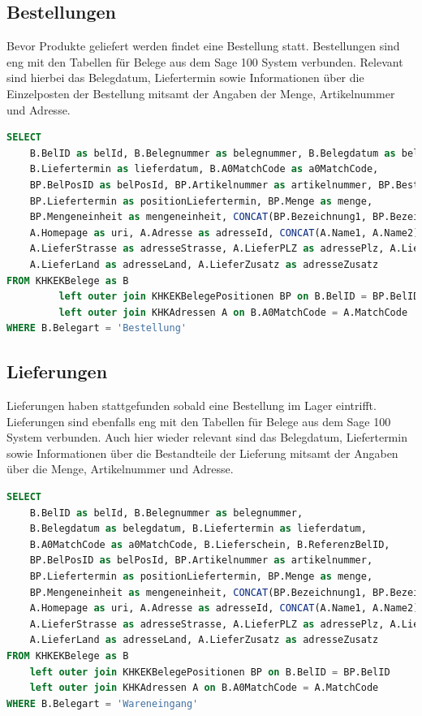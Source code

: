\subsection{Bestellungen}
Bevor Produkte geliefert werden findet eine Bestellung statt. Bestellungen sind eng mit den Tabellen für Belege aus dem Sage 100 System verbunden. Relevant sind hierbei das Belegdatum, Liefertermin sowie Informationen über die Einzelposten der Bestellung mitsamt der Angaben der Menge, Artikelnummer und Adresse.
\begin{lstlisting}[language=SQL,caption=Bestellungen Join SQL Query]
SELECT
    B.BelID as belId, B.Belegnummer as belegnummer, B.Belegdatum as belegdatum,
    B.Liefertermin as lieferdatum, B.A0MatchCode as a0MatchCode,
    BP.BelPosID as belPosId, BP.Artikelnummer as artikelnummer, BP.Bestellnummer,
    BP.Liefertermin as positionLiefertermin, BP.Menge as menge,
    BP.Mengeneinheit as mengeneinheit, CONCAT(BP.Bezeichnung1, BP.Bezeichnung2) as bezeichnung,
    A.Homepage as uri, A.Adresse as adresseId, CONCAT(A.Name1, A.Name2) as adresseName,
    A.LieferStrasse as adresseStrasse, A.LieferPLZ as adressePlz, A.LieferOrt as adresseOrt,
    A.LieferLand as adresseLand, A.LieferZusatz as adresseZusatz
FROM KHKEKBelege as B
         left outer join KHKEKBelegePositionen BP on B.BelID = BP.BelID
         left outer join KHKAdressen A on B.A0MatchCode = A.MatchCode
WHERE B.Belegart = 'Bestellung'
\end{lstlisting}

\subsection{Lieferungen}
Lieferungen haben stattgefunden sobald eine Bestellung im Lager eintrifft. Lieferungen sind ebenfalls eng mit den Tabellen für Belege aus dem Sage 100 System verbunden. Auch hier wieder relevant sind das Belegdatum, Liefertermin sowie Informationen über die Bestandteile der Lieferung mitsamt der Angaben über die Menge, Artikelnummer und Adresse.
\begin{lstlisting}[language=SQL,caption=Lieferungen Join SQL Query]
SELECT
    B.BelID as belId, B.Belegnummer as belegnummer,
    B.Belegdatum as belegdatum, B.Liefertermin as lieferdatum,
    B.A0MatchCode as a0MatchCode, B.Lieferschein, B.ReferenzBelID,
    BP.BelPosID as belPosId, BP.Artikelnummer as artikelnummer,
    BP.Liefertermin as positionLiefertermin, BP.Menge as menge,
    BP.Mengeneinheit as mengeneinheit, CONCAT(BP.Bezeichnung1, BP.Bezeichnung2) as bezeichnung,
    A.Homepage as uri, A.Adresse as adresseId, CONCAT(A.Name1, A.Name2) as adresseName,
    A.LieferStrasse as adresseStrasse, A.LieferPLZ as adressePlz, A.LieferOrt as adresseOrt,
    A.LieferLand as adresseLand, A.LieferZusatz as adresseZusatz
FROM KHKEKBelege as B
    left outer join KHKEKBelegePositionen BP on B.BelID = BP.BelID
    left outer join KHKAdressen A on B.A0MatchCode = A.MatchCode
WHERE B.Belegart = 'Wareneingang'
\end{lstlisting}

